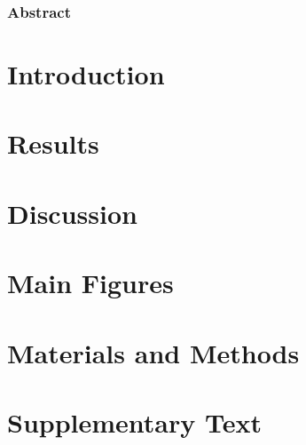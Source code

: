 \documentclass{article}
\begin{document}
\label{sec:abstract}


\begin{center}
\subsubsection*{Abstract}
\end{center}
\label{sec:abstract}

\clearpage

\linenumbers

\section{Introduction}
\label{sec:introduction}


\section{Results}
\label{sec:results}


\section{Discussion}
\label{sec:discussion}

\clearpage

\label{sec:acknowledgments}

\clearpage

\section{Main Figures}
\label{sec:figures}

\clearpage

\label{sec:supplementary}

\clearpage


\section{Materials and Methods}
\label{sec:materials_and_methods}







\clearpage

\section{Supplementary Text}
\label{sec:supplementary_text}

\clearpage

\clearpage

\clearpage
\end{document}
